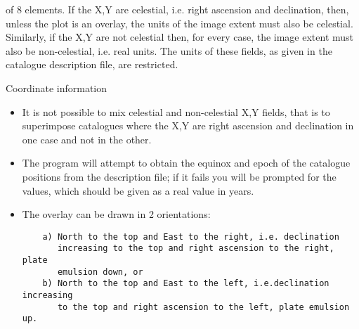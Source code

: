 \begin{description}
\begin{itemize}
of 8 elements.
If the X,Y are celestial, i.e. right ascension and declination, then,
unless the plot is an overlay, the units of the image extent must also be
celestial.
Similarly, if the X,Y are not celestial then, for every case, the image
extent must also be non-celestial, i.e. real units.
The units of these fields, as given in the catalogue description file, are
restricted.
 \end{itemize}
\item{Coordinate information}
 \begin{itemize}
\item It is not possible to mix celestial and non-celestial X,Y fields,
that is to superimpose catalogues where the X,Y are right ascension
and declination in one case and not in the other.
\item The program will attempt to obtain the equinox and epoch of the
catalogue positions from the description file; if it fails you
will be prompted for the values, which should be given as a real
value in years.
\item The overlay can be drawn in 2 orientations:
\begin{verbatim}
    a) North to the top and East to the right, i.e. declination
       increasing to the top and right ascension to the right, plate
       emulsion down, or
    b) North to the top and East to the left, i.e.declination increasing
       to the top and right ascension to the left, plate emulsion up.


\end{verbatim}
\end{itemize}
\end{description}
